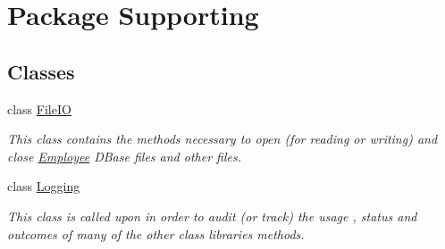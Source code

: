 \hypertarget{namespace_supporting}{\section{Package Supporting}
\label{namespace_supporting}
}
\subsection*{Classes}
\begin{DoxyCompactItemize}
\item 
class \hyperlink{class_supporting_1_1_file_i_o}{File\-I\-O}
\begin{DoxyCompactList}\small\item\em This class contains the methods necessary to open (for reading or writing) and close \hyperlink{namespace_employee}{Employee} D\-Base files and other files. \end{DoxyCompactList}\item 
class \hyperlink{class_supporting_1_1_logging}{Logging}
\begin{DoxyCompactList}\small\item\em This class is called upon in order to audit (or track) the usage , status and outcomes of many of the other class libraries methods. \end{DoxyCompactList}\end{DoxyCompactItemize}
